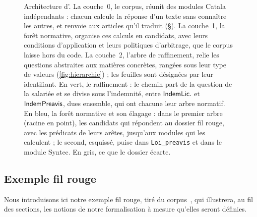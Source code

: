 \begin{figure}[t]
\caption{Architecture d'\ALex{}. La couche~0, le corpus, réunit des modules
  Catala indépendants : chacun calcule la réponse d'un texte sans connaître les
  autres, et renvoie aux articles qu'il traduit (\S). La couche~1, la forêt
  normative, organise ces calculs en candidats, avec leurs conditions
  d'application et leurs politiques d'arbitrage, que le corpus laisse hors du
  code. La couche~2, l'arbre de raffinement, relie les questions abstraites aux
  matières concrètes, rangées sous leur type de valeurs
  (\autoref{fig:hierarchie}) ; les feuilles sont désignées par leur
  identifiant. En vert, le raffinement : le chemin part de la question de la
  salariée et se divise sous l'indemnité, entre \(\mathsf{IndemLic.}\) et \(\mathsf{IndemPreavis}\), dues
  ensemble, qui ont chacune leur arbre normatif. En bleu, la forêt normative
  et son élagage : dans le premier arbre (racine en point), les candidats qui
  répondent au dossier fil rouge, avec les prédicats de leurs arêtes,
  jusqu'aux modules qui les calculent ; le second, esquissé, puise dans
  \texttt{Loi\_preavis} et dans le module Syntec. En gris, ce que le dossier
  écarte.}
\label{fig:A-Lex}
\end{figure}

\subsection{Exemple fil rouge}\label{sec:exemple}
Nous introduisons ici notre exemple fil rouge, tiré du corpus~\cite{corpuslumo}, qui illustrera, au fil des sections, les notions de notre formalisation à mesure qu'elles seront définies.

